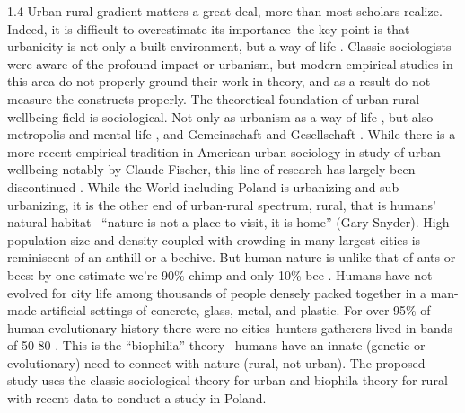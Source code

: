 \documentclass[10pt, letterpaper]{article}
\begin{document}
\begin{spacing}{1.4}
Urban-rural gradient matters a great deal, more than
most scholars realize. Indeed, it is difficult to overestimate its importance--the key
point is that urbanicity is not only a built environment, but a way of life
\citep{wirth38}. %
Classic sociologists were aware of the profound impact or urbanism, but modern
empirical studies in this area do not properly ground their work in theory, and
as a result do not measure the constructs properly. 
The theoretical foundation of urban-rural wellbeing field is sociological. Not only as 
urbanism as a way of life \citep{wirth38}, but also metropolis and mental life 
\citep{simmel03}, and Gemeinschaft and Gesellschaft \citep{tonnies57}.
 While there is a more recent empirical tradition in American urban sociology in study of urban wellbeing
 notably by Claude Fischer, this line of research has largely been discontinued %
  \citep[e.g.,][]{fischer73}. %
% 
%
While the World including Poland is urbanizing and sub-urbanizing, it is 
the other end of urban-rural spectrum, rural, that is humans' natural habitat--
``nature is not a place to visit, it is home'' (Gary Snyder)\citep{pretty12}.
%
High population size and density coupled with crowding in many largest cities
is reminiscent of an anthill or a beehive. 
But human nature is unlike that of ants or bees: by one estimate we're 90\%
chimp and only 10\% bee  \citep{haidt12B}.
Humans have not evolved for city life among thousands of people densely packed together in a
man-made artificial settings of concrete, glass, metal, and plastic.
For over 95\% of human evolutionary history there were no
cities--hunters-gatherers lived in bands of 50-80 \citep{maryanski92}. 
%
This is the ``biophilia'' theory %
--humans have an innate (genetic or evolutionary) need to connect with nature
(rural, not urban).
% 
The proposed study uses the classic sociological theory for urban and
 biophila theory for rural with recent data
 to conduct a %
 study
 in Poland. 
 

\end{spacing}
\end{document}
